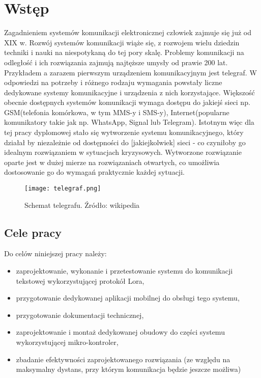 \newpage %
\section{Wstęp}
Zagadnieniem systemów komunikacji elektronicznej człowiek zajmuje się już od XIX w. Rozwój systemów komunikacji wiąże się, z rozwojem wielu dziedzin techniki i nauki na niespotykaną do tej pory skalę. Problemy komunikacji na odległość i ich rozwiązania zajmują najtęższe umysły od prawie 200 lat. Przykładem a zarazem pierwszym urządzeniem komunikacyjnym jest telegraf\cite{wiki:telegraf2023}.
W odpowiedzi na potrzeby i różnego rodzaju wymagania powstały liczne dedykowane systemy komunikacyjne i urządzenia z nich korzystające.
Większość obecnie dostępnych systemów komunikacji wymaga dostępu do jakiejś sieci np. GSM(telefonia komórkowa, w tym MMS-y i SMS-y), Internet(popularne komunikatory takie jak np. WhatsApp, Signal lub Telegram).
Istotnym więc dla tej pracy dyplomowej stało się wytworzenie systemu komunikacyjnego, który działał by niezależnie od dostępności do [jakiejkolwiek] sieci - co czyniłoby go idealnym rozwiązaniem w sytuacjach kryzysowych.
Wytworzone rozwiązanie oparte jest w dużej mierze na rozwiązaniach otwartych, co umożliwia dostosowanie go do wymagań praktycznie każdej sytuacji.
\begin{figure}[!h]
	\centering \texttt{[image: telegraf.png]}
	\caption{Schemat telegrafu. Źródło: wikipedia}
	\label{fig:telegraf}
\end{figure}
\subsection{Cele pracy}
Do celów niniejszej pracy należy:
\begin{itemize}
	\item zaprojektowanie, wykonanie i przetestowanie systemu do komunikacji tekstowej wykorzystującej protokół Lora,
	\item przygotowanie dedykowanej aplikacji mobilnej do obsługi tego systemu,
	\item przygotowanie dokumentacji technicznej,
	\item zaprojektowanie i montaż dedykowanej obudowy do części systemu wykorzystującej mikro-kontroler,
	\item zbadanie efektywności zaprojektowanego rozwiązania (ze względu na maksymalny dystans, przy którym komunikacja będzie jeszcze możliwa)
\end{itemize}